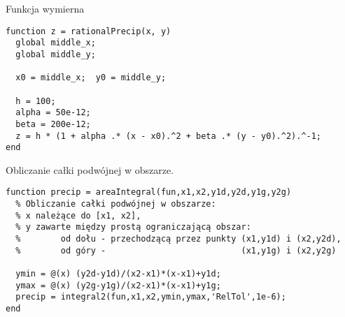 Funkcja wymierna
\begin{lstlisting}
function z = rationalPrecip(x, y)
  global middle_x;
  global middle_y;

  x0 = middle_x;  y0 = middle_y;

  h = 100;
  alpha = 50e-12; 
  beta = 200e-12;
  z = h * (1 + alpha .* (x - x0).^2 + beta .* (y - y0).^2).^-1;
end
\end{lstlisting}
Obliczanie całki podwójnej w obszarze.
\begin{lstlisting}
function precip = areaIntegral(fun,x1,x2,y1d,y2d,y1g,y2g)
  % Obliczanie całki podwójnej w obszarze:
  % x należące do [x1, x2],
  % y zawarte między prostą ograniczającą obszar:
  %        od dołu - przechodzącą przez punkty (x1,y1d) i (x2,y2d),
  %        od góry -                           (x1,y1g) i (x2,y2g)

  ymin = @(x) (y2d-y1d)/(x2-x1)*(x-x1)+y1d;
  ymax = @(x) (y2g-y1g)/(x2-x1)*(x-x1)+y1g;
  precip = integral2(fun,x1,x2,ymin,ymax,'RelTol',1e-6);
end
\end{lstlisting}


